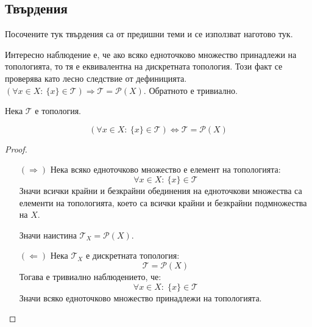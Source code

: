 \subsection{Твърдения}
Посочените тук твърдения са от предишни теми и се използват наготово тук.

Интересно наблюдение е, че ако всяко едноточково множество принадлежи на топологията, то тя е еквивалентна на дискретната топология. Този факт се проверява като лесно следствие от дефиницията. $(\forall x \in X:\ \{x\} \in \mathcal T) \Rightarrow \mathcal T = \mathcal P(X)$. Обратното е тривиално.
\begin{lemma}
    Нека $\mathcal T$ е топология.

    \begin{equation*}
        (\forall x \in X:\ \{x\} \in \mathcal T) \iff \mathcal T = \mathcal P (X)
    \end{equation*}
\end{lemma}
\begin{proof}
    \begin{itemize}
        \item[$(\Rightarrow)$] Нека всяко едноточково множество е елемент на топологията:
        \begin{equation}
            \forall x \in X:\ \{x\} \in \mathcal T
        \end{equation}
        Значи всички крайни и безкрайни обединения на едноточкови множества са елементи на топологията, което са всички крайни и безкрайни подмножества на $X$.
        
        Значи наистина $\mathcal T_X = \mathcal P (X)$.

        \item[$(\Leftarrow)$] Нека $\mathcal T_X$ е дискретната топология:
        \begin{equation}
            \mathcal T = \mathcal P (X)
        \end{equation}
        Тогава е тривиално наблюдението, че:
        \begin{equation}
            \forall x \in X:\; \{x\} \in \mathcal T
        \end{equation}
        Значи всяко едноточково множество принадлежи на топологията.
    \end{itemize}
\end{proof}